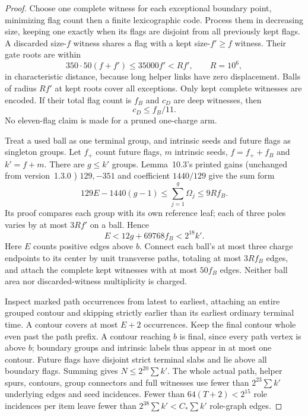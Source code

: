 \begin{proof}
Choose one complete witness for each exceptional boundary point, minimizing flag count then a finite lexicographic code. Process them in decreasing size, keeping one exactly when its flags are disjoint from all previously kept flags. A discarded size-$f$ witness shares a flag with a kept size-$f'\ge f$ witness. Their gate roots are within
\[
 350\cdot50(f+f')\le35000f'<Rf',\qquad R=10^6,
\]
in characteristic distance, because long helper links have zero displacement. Balls of radius $Rf'$ at kept roots cover all exceptions. Only kept complete witnesses are encoded. If their total flag count is $f_B$ and $c_D$ are deep witnesses, then
\begin{equation}\label{eq:three-anchor-cost}
 c_D\le f_B/11.
\end{equation}
No eleven-flag claim is made for a pruned one-charge arm.

Treat a used ball as one terminal group, and intrinsic seeds and future flags as singleton groups. Let $f_+$ count future flags, $m$ intrinsic seeds, $f=f_++f_B$ and $k'=f+m$. There are $g\le k'$ groups. Lemma~10.3's printed gains (unchanged from version~1.3.0 \cite{DMnoise13}) $129,-351$ and coefficient $1440/129$ give the sum form
\[
 129E-1440(g-1)\le\sum_{j=1}^g\Omega_j\le9Rf_B.
\]
Its proof compares each group with its own reference leaf; each of three poles varies by at most $3Rf'$ on a ball. Hence
\begin{equation}\label{eq:three-boundary-edges}
 E<12g+69768f_B<2^{18}k'.
\end{equation}
Here $E$ counts positive edges above $b$. Connect each ball's at most three charge endpoints to its center by unit transverse paths, totaling at most $3Rf_B$ edges, and attach the complete kept witnesses with at most $50f_B$ edges. Neither ball area nor discarded-witness multiplicity is charged.

Inspect marked path occurrences from latest to earliest, attaching an entire grouped contour and skipping strictly earlier than its earliest ordinary terminal time. A contour covers at most $E+2$ occurrences. Keep the final contour whole even past the path prefix. A contour reaching $b$ is final, since every path vertex is above $b$; boundary groups and intrinsic labels thus appear in at most one contour. Future flags have disjoint strict terminal slabs and lie above all boundary flags. Summing gives $N\le2^{20}\sum k'$. The whole actual path, helper spurs, contours, group connectors and full witnesses use fewer than $2^{23}\sum k'$ underlying edges and seed incidences. Fewer than $64(T+2)<2^{15}$ role incidences per item leave fewer than $2^{38}\sum k'<C_*\sum k'$ role-graph edges.


\end{proof}
